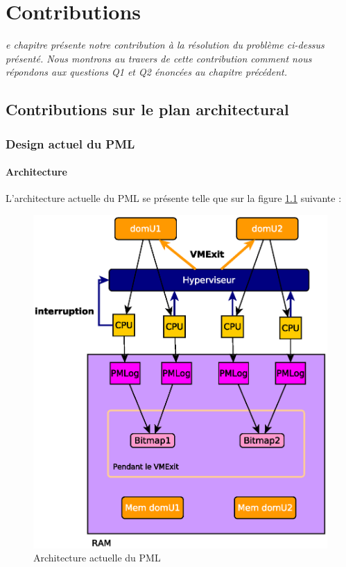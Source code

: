 \let\textcircled=\pgftextcircled
\chapter{Contributions}
\label{chap:contrib}

\textit{e chapitre présente notre contribution à la résolution du problème ci-dessus présenté. Nous montrons au travers de cette contribution comment nous répondons aux questions Q1 et Q2 énoncées au chapitre précédent.}

\minitoc

\newpage  
\section{Contributions sur le plan architectural}

\subsection{Design actuel du PML}
\label{subsection:design_actuel_pml}

\subsubsection{Architecture}
L'architecture actuelle du PML se présente telle que sur la figure \ref{fig:pml_actuel} suivante :
\begin{figure}[H]
    \centering
    \includegraphics[scale=.8]{chapters/3/fig3/PMLactual3}
    \caption{Architecture actuelle du PML}
    \label{fig:pml_actuel}
\end{figure}

